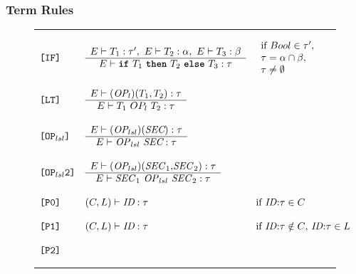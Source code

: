 \documentclass[12pt]{article} %
\newcommand{\reserved}[1]{\textbf{\texttt{#1}}} %
\newcommand{\RULELAB}[1]{\texttt{#1}}
\newcommand{\UNSPACEFORBOX}{\vspace{-2ex}}
\newcommand{\HLINE}{\UNSPACEFORBOX%
\begin{flushleft}\rule{\textwidth}{0.01in}\end{flushleft}%
\UNSPACEFORBOX}
\newenvironment{BFIGURE}{

\begin{figure}
\small
\HLINE
}{
\HLINE
\normalsize
\end{figure}
}
\begin{document}
\subsubsection{Term Rules}
\label{termrules}
\begin{BFIGURE}
\begin{displaymath}
\begin{array}{lll}
\RULELAB{[IF]} &
\begin{array}{c}
E \vdash T_1:\tau',~E \vdash T_2:\alpha,~E \vdash T_3:\beta \\
\hline
E \vdash \mbox{\reserved{if} }T_1 \mbox{ \reserved{then} } T_2 \mbox{
\reserved{else} } T_3:\tau
\end{array}
&
\begin{array}{l}
\mbox{if } Bool \in \tau',\\
\tau = \alpha \cap \beta,\\
\tau \not= \emptyset
\end{array}
\\
~\\
\RULELAB{[LT]} &
\begin{array}{c}
E \vdash (\mbox{\it OP}_{l})(T_1,T_2):\tau \\
\hline
E \vdash T_1~ OP_l~ T_2:\tau
\end{array}
\\
~\\
\RULELAB{[OP$_{lsl}$]} &
\begin{array}{c}
E \vdash (\mbox{\it OP}_{lsl})(\mbox{\it SEC}):\tau\\
\hline
E \vdash \mbox{\textit{OP}$_{lsl}$~\it SEC}:\tau
\end{array}
\\
~\\
\RULELAB{[OP$_{lsl}$2]} &
\begin{array}{c}
E \vdash (\mbox{\it OP}_{lsl})(\mbox{\textit{SEC}$_1$,\textit{SEC}$_2$}):\tau\\
\hline
E \vdash \mbox{\textit{SEC}$_1$ \textit{OP}$_{lsl}$ \textit{SEC}$_2$}:\tau
\end{array}
\\
~\\
\RULELAB{[P0]} &
(C,L) \vdash \mbox{\it ID}:\tau
&
\mbox{if \textit{ID}:$\tau \in C$}
\\
~\\
\RULELAB{[P1]} &
(C,L) \vdash \mbox{\it ID}:\tau
&
\mbox{if \textit{ID}:$\tau \notin C$,~\textit{ID}:$\tau \in L$}
\\
~\\
\RULELAB{[P2]} &
\begin{array}{c}

\end{array}
\end{array}
\end{displaymath}
\end{BFIGURE}
\end{document}
